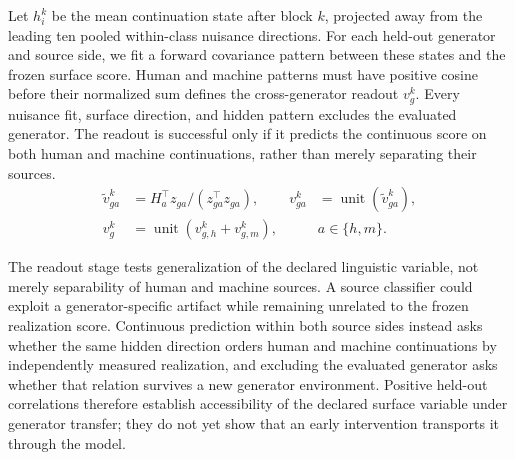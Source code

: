 Let \(h_i^k\) be the mean continuation state after block \(k\), projected away from the leading ten pooled within-class nuisance directions. For each held-out generator and source side, we fit a forward covariance pattern between these states and the frozen surface score. Human and machine patterns must have positive cosine before their normalized sum defines the cross-generator readout \(v_g^k\). Every nuisance fit, surface direction, and hidden pattern excludes the evaluated generator. The readout is successful only if it predicts the continuous score on both human and machine continuations, rather than merely separating their sources.
\begin{equation}
\begin{aligned}
\widetilde v_{ga}^k&=H_a^\top z_{ga}/(z_{ga}^\top z_{ga}), &
v_{ga}^k&=\operatorname{unit}(\widetilde v_{ga}^k),\\
v_g^k&=\operatorname{unit}(v_{g,h}^k+v_{g,m}^k), && a\in\{h,m\}.
\end{aligned}
\label{eq:covariance-readout}
\end{equation}

The readout stage tests generalization of the declared linguistic variable, not merely separability of human and machine sources. A source classifier could exploit a generator-specific artifact while remaining unrelated to the frozen realization score. Continuous prediction within both source sides instead asks whether the same hidden direction orders human and machine continuations by independently measured realization, and excluding the evaluated generator asks whether that relation survives a new generator environment. Positive held-out correlations therefore establish accessibility of the declared surface variable under generator transfer; they do not yet show that an early intervention transports it through the model.

